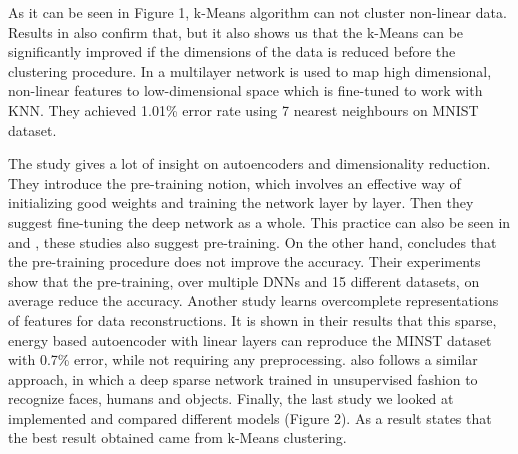 \documentclass[journal]{IEEEtran}
\begin{document}
As it can be seen in Figure 1, k-Means algorithm can not cluster non-linear data. Results in \cite{xie2016unsupervised} also confirm that, but it also shows us that the k-Means can be significantly improved if the dimensions of the data is reduced before the clustering procedure. In \cite{salakhutdinov2007learning} a multilayer network is used to map high dimensional, non-linear features to low-dimensional space which is fine-tuned to work with KNN. They achieved 1.01\% error rate using 7 nearest neighbours on MNIST dataset.\par

The study \cite{hinton2006reducing} gives a lot of insight on autoencoders and dimensionality reduction. They introduce the pre-training notion, which involves an effective way of initializing good weights and training the network layer by layer. Then they suggest fine-tuning the deep network as a whole. This practice can also be seen in \cite{vincent2010stacked} and \cite{xie2016unsupervised}, these studies also suggest pre-training. On the other hand, \cite{ma2015deep} concludes that the pre-training procedure does not improve the accuracy. Their experiments show that the pre-training, over multiple DNNs and 15 different datasets, on average reduce the accuracy. Another study\cite{poultney2007efficient} learns overcomplete representations of features for data reconstructions. It is shown in their results that this sparse, energy based autoencoder with linear layers can reproduce the MINST dataset with 0.7\% error, while not requiring any preprocessing.\cite{le2011building} also follows a similar approach, in which a deep sparse network trained in unsupervised fashion to recognize faces, humans and objects.
Finally, the last study we looked at implemented and compared different models (Figure 2). As a result \cite{coates2011analysis} states that the best result obtained came from k-Means clustering.
\end{document}
